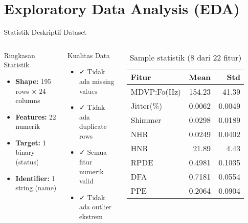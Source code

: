 \documentclass[aspectratio=169]{beamer}
\begin{document}
\section{Exploratory Data Analysis (EDA)}

\begin{frame}{Statistik Deskriptif Dataset}
\begin{columns}
\begin{block}{Ringkasan Statistik}
\begin{itemize}
    \item \textbf{Shape:} 195 rows × 24 columns
    \item \textbf{Features:} 22 numerik
    \item \textbf{Target:} 1 binary (status)
    \item \textbf{Identifier:} 1 string (name)
\end{itemize}
\end{block}

\begin{block}{Kualitas Data}
\begin{itemize}
    \item ✓ Tidak ada missing values
    \item ✓ Tidak ada duplicate rows
    \item ✓ Semua fitur numerik valid
    \item ✓ Tidak ada outlier ekstrem
\end{itemize}
\end{block}

\begin{table}
\centering
\tiny
\begin{tabular}{lrr}
\toprule
\textbf{Fitur} & \textbf{Mean} & \textbf{Std} \\
\midrule
MDVP:Fo(Hz) & 154.23 & 41.39 \\
Jitter(\%) & 0.0062 & 0.0049 \\
Shimmer & 0.0298 & 0.0189 \\
NHR & 0.0249 & 0.0402 \\
HNR & 21.89 & 4.43 \\
RPDE & 0.4981 & 0.1035 \\
DFA & 0.7181 & 0.0554 \\
PPE & 0.2064 & 0.0904 \\
\bottomrule
\end{tabular}
\caption{Sample statistik (8 dari 22 fitur)}
\end{table}
\end{columns}
\end{frame}
\end{document}
